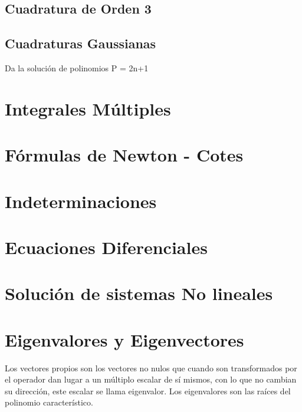 \subsection{Cuadratura de Orden 3}

\subsection{Cuadraturas Gaussianas}
Da la soluci\'on de polinomios P = 2n+1

\section{Integrales M\'ultiples}

\section{F\'ormulas de Newton - Cotes}

\section{Indeterminaciones}

\section{Ecuaciones Diferenciales}

\section{Soluci\'on de sistemas No lineales}

\section{Eigenvalores y Eigenvectores}
Los vectores propios son los vectores no nulos que cuando son transformados por el operador dan lugar a un m\'ultiplo escalar de s\'i mismos, con lo que no cambian su direcci\'on, este escalar se llama eigenvalor. Los eigenvalores son las ra\'ices del polinomio caracter\'istico.

